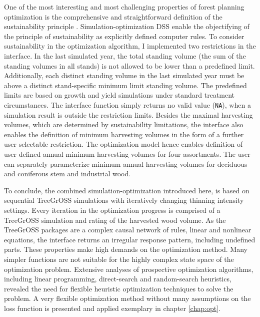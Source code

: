 One of the most interesting and most challenging properties of forest planning optimization is the comprehensive and straightforward definition of the sustainability principle \citep[p. 15]{kangas_2015}. Simulation-optimization DSS enable the objectifying of the principle of sustainability as explicitly defined computer rules. To consider sustainability in the optimization algorithm, I implemented two restrictions in the interface. In the last simulated year, the total standing volume (the sum of the standing volumes in all stands) is not allowed to be lower than a predefined limit. Additionally, each distinct standing volume in the last simulated year must be above a distinct stand-specific minimum limit standing volume. The predefined limits are based on growth and yield simulations under standard treatment circumstances. The interface function simply returns no valid value ({\tt NA}), when a simulation result is outside the restriction limits. Besides the maximal harvesting volumes, which are determined by sustainability limitations, the interface also enables the definition of minimum harvesting volumes in the form of a further user selectable restriction. The optimization model hence enables definition of user defined annual minimum harvesting volumes for four assortments. The user can separately parameterize minimum annual harvesting volumes for deciduous and coniferous stem and industrial wood.

To conclude, the combined simulation-optimization introduced here, is based on sequential TreeGrOSS simulations with iteratively changing thinning intensity settings. Every iteration in the optimization progress is comprised of a TreeGrOSS simulation and rating of the harvested wood volume. As the TreeGrOSS packages are a complex causal network of rules, linear and nonlinear equations, the interface returns an irregular response pattern, including undefined parts. These properties make high demands on the optimization method. Many simpler functions are not suitable for the highly complex state space of the optimization problem. Extensive analyses of prospective optimization algorithms, including linear programming, direct-search and random-search heuristics, revealed the need for flexible heuristic optimization techniques to solve the problem. A very flexible optimization method without many assumptions on the loss function is presented and applied exemplary in chapter \ref{chap:opt}.

